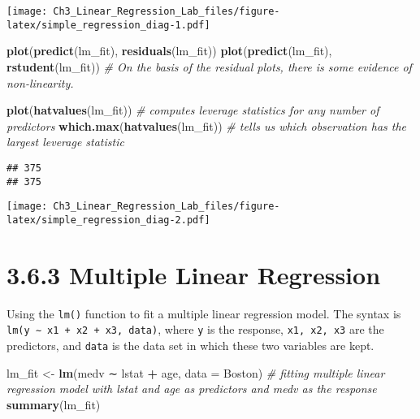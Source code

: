\documentclass[]{article}
\newenvironment{Shaded}{\begin{snugshade}}{\end{snugshade}}
\newcommand{\CommentTok}[1]{\textcolor[rgb]{0.56,0.35,0.01}{\textit{#1}}}
\newcommand{\DataTypeTok}[1]{\textcolor[rgb]{0.13,0.29,0.53}{#1}}
\newcommand{\KeywordTok}[1]{\textcolor[rgb]{0.13,0.29,0.53}{\textbf{#1}}}
\newcommand{\NormalTok}[1]{#1}
\newcommand{\OperatorTok}[1]{\textcolor[rgb]{0.81,0.36,0.00}{\textbf{#1}}}
\newcommand{\StringTok}[1]{\textcolor[rgb]{0.31,0.60,0.02}{#1}}
\begin{document}
\texttt{[image: Ch3\_Linear\_Regression\_Lab\_files/figure-latex/simple\_regression\_diag-1.pdf]}

\begin{Shaded}
\begin{Highlighting}[]
\KeywordTok{plot}\NormalTok{(}\KeywordTok{predict}\NormalTok{(lm_fit), }\KeywordTok{residuals}\NormalTok{(lm_fit))}
\KeywordTok{plot}\NormalTok{(}\KeywordTok{predict}\NormalTok{(lm_fit), }\KeywordTok{rstudent}\NormalTok{(lm_fit))}
\CommentTok{# On the basis of the residual plots, there is some evidence of non-linearity.}

\KeywordTok{plot}\NormalTok{(}\KeywordTok{hatvalues}\NormalTok{(lm_fit)) }\CommentTok{# computes leverage statistics for any number of predictors}
\KeywordTok{which.max}\NormalTok{(}\KeywordTok{hatvalues}\NormalTok{(lm_fit)) }\CommentTok{# tells us which observation has the largest leverage statistic}
\end{Highlighting}
\end{Shaded}

\begin{verbatim}
## 375 
## 375
\end{verbatim}

\texttt{[image: Ch3\_Linear\_Regression\_Lab\_files/figure-latex/simple\_regression\_diag-2.pdf]}

\hypertarget{multiple-linear-regression}{%
\section{3.6.3 Multiple Linear
Regression}\label{multiple-linear-regression}}

Using the \texttt{lm()} function to fit a multiple linear regression
model. The syntax is \texttt{lm(y\ ∼\ x1\ +\ x2\ +\ x3,\ data)}, where
\texttt{y} is the response, \texttt{x1,\ x2,\ x3} are the predictors,
and \texttt{data} is the data set in which these two variables are kept.

\begin{Shaded}
\begin{Highlighting}[]
\NormalTok{lm_fit <-}\StringTok{ }\KeywordTok{lm}\NormalTok{(medv ∼ lstat }\OperatorTok{+}\StringTok{ }\NormalTok{age, }\DataTypeTok{data =}\NormalTok{ Boston) }\CommentTok{# fitting multiple linear regression model with lstat and age as predictors and medv as the response}
\KeywordTok{summary}\NormalTok{(lm_fit)}
\end{Highlighting}
\end{Shaded}
\end{document}
